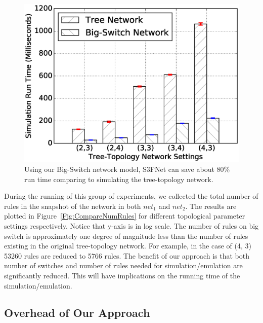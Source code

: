 \begin{figure}[h]
\centering
\includegraphics[scale=.42]{figures/comp_sim_time.eps}
\caption{Using our Big-Switch network model, S3FNet can save about 80\% run time
        comparing to simulating the tree-topology network.}
\label{Fig:CompareSimulationTime}
\end{figure}

During the running of this group of experiments,
we collected the total number of rules in the snapshot of the network in both $net_1$
and $net_2$.
The results are plotted in Figure~\ref{Fig:CompareNumRules} for different
topological parameter settings respectively.
Notice that y-axis is in log scale.
The number of rules on big switch is approximately one degree of magnitude less
than the number of rules existing in the original tree-topology network.
For example, in the case of (4, 3) 53260 rules are reduced to 5766 rules.
The benefit of our approach is that both number of switches and number of rules needed
for simulation/emulation are significantly reduced.
This will have implications on the running time of the simulation/emulation.



\subsection{Overhead of Our Approach}

